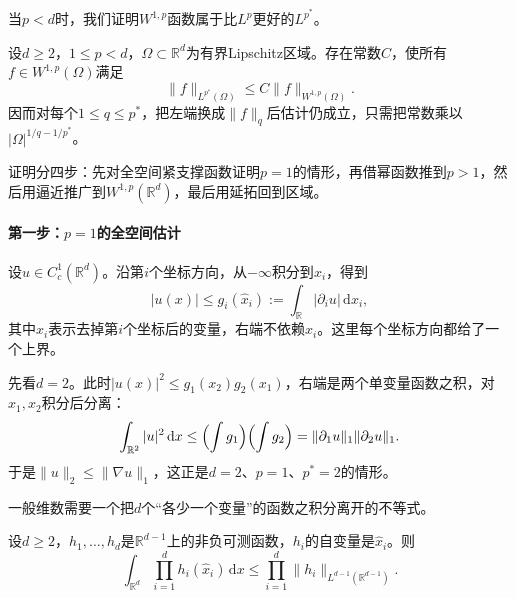 当$p<d$时，我们证明$W^{1,p}$函数属于比$L^p$更好的$L^{p^*}$。

\begin{theorem}[Sobolev嵌入，$p<d$]
\label{thm:sobolev-embedding-subcritical}
设$d\geq2$，$1\leq p<d$，$\Omega\subset\mathbb R^d$为有界Lipschitz区域。存在常数$C$，使所有$f\in W^{1,p}(\Omega)$满足
\begin{equation}
\lVert f\rVert_{L^{p^*}(\Omega)}\leq C\lVert f\rVert_{W^{1,p}(\Omega)} .
\label{eq:sobolev-embedding-subcritical}
\end{equation}
因而对每个$1\leq q\leq p^*$，把左端换成$\lVert f\rVert_q$后估计仍成立，只需把常数乘以$|\Omega|^{1/q-1/p^*}$。
\end{theorem}

证明分四步：先对全空间紧支撑函数证明$p=1$的情形，再借幂函数推到$p>1$，然后用逼近推广到$W^{1,p}(\mathbb R^d)$，最后用延拓回到区域。

\paragraph{第一步：\texorpdfstring{$p=1$}{p=1}的全空间估计}
设$u\in C_c^1(\mathbb R^d)$。沿第$i$个坐标方向，从$-\infty$积分到$x_i$，得到
\[
|u(x)|\leq g_i(\hat x_i):=\int_{\mathbb R}|\partial_iu|\,\mathrm dx_i ,
\]
其中$\hat x_i$表示去掉第$i$个坐标后的变量，右端不依赖$x_i$。这里每个坐标方向都给了一个上界。

先看$d=2$。此时$|u(x)|^2\leq g_1(x_2)g_2(x_1)$，右端是两个单变量函数之积，对$x_1,x_2$积分后分离：
\[
\int_{\mathbb R^2}|u|^2\,\mathrm dx\leq\Bigl(\int g_1\Bigr)\Bigl(\int g_2\Bigr)=\lVert\partial_1u\rVert_1\lVert\partial_2u\rVert_1 .
\]
于是$\lVert u\rVert_2\leq\lVert\nabla u\rVert_1$，这正是$d=2$、$p=1$、$p^*=2$的情形。

一般维数需要一个把$d$个“各少一个变量”的函数之积分离开的不等式。

\begin{lemma}[分离变量的乘积估计]
\label{lem:sobolev-loomis-whitney}
设$d\geq2$，$h_1,\ldots,h_d$是$\mathbb R^{d-1}$上的非负可测函数，$h_i$的自变量是$\hat x_i$。则
\begin{equation}
\int_{\mathbb R^d}\prod_{i=1}^dh_i(\hat x_i)\,\mathrm dx\leq\prod_{i=1}^d\lVert h_i\rVert_{L^{d-1}(\mathbb R^{d-1})} .
\label{eq:sobolev-loomis-whitney}
\end{equation}
\end{lemma}

